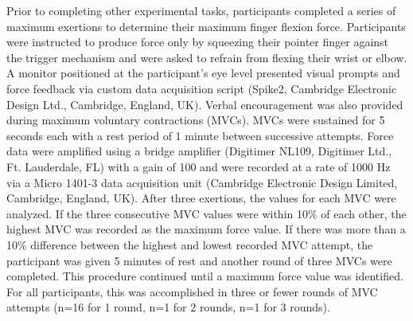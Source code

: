 \documentclass[]{cik}%
\begin{document}
Prior to completing other experimental tasks, participants completed a
series of maximum exertions to determine their maximum finger flexion
force. Participants were instructed to produce force only by squeezing
their pointer finger against the trigger mechanism and were asked to
refrain from flexing their wrist or elbow. A monitor positioned at the
participant's eye level presented visual prompts and force feedback via
custom data acquisition script (Spike2, Cambridge Electronic Design
Ltd., Cambridge, England, UK). Verbal encouragement was also provided
during maximum voluntary contractions (MVCs). MVCs were sustained for 5
seconds each with a rest period of 1 minute between successive attempts.
Force data were amplified using a bridge amplifier (Digitimer NL109,
Digitimer Ltd., Ft. Lauderdale, FL) with a gain of 100 and were recorded
at a rate of 1000 Hz via a Micro 1401-3 data acquisition unit (Cambridge
Electronic Design Limited, Cambridge, England, UK). After three
exertions, the values for each MVC were analyzed. If the three
consecutive MVC values were within 10\% of each other, the highest MVC
was recorded as the maximum force value. If there was more than a 10\%
difference between the highest and lowest recorded MVC attempt, the
participant was given 5 minutes of rest and another round of three MVCs
were completed. This procedure continued until a maximum force value was
identified. For all participants, this was accomplished in three or
fewer rounds of MVC attempts (n=16 for 1 round, n=1 for 2 rounds, n=1
for 3 rounds).
\end{document}
